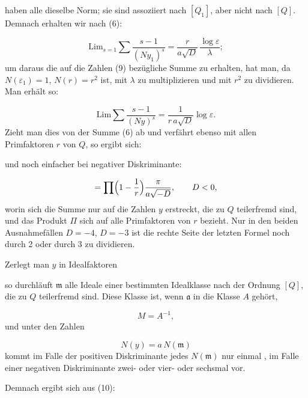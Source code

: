
haben alle dieselbe Norm; sie sind assoziiert nach $[Q_1]$, aber
nicht nach $[Q]$. Demnach erhalten wir nach (6):

\[ \mathrm{Lim}_{s=1}\sum\frac{s-1}{(Ny_1)^s} = \frac{r}{a\sqrt D}\,\frac{\log\varepsilon}{\lambda}; \]
um daraus die auf die Zahlen (9) bezügliche Summe zu erhalten,
hat man, da $N(\varepsilon_1)=1$, $N(r)=r^2$ ist, mit $\lambda$ zu multiplizieren
und mit $r^2$ zu dividieren. Man erhält so:

\[ \mathrm{Lim}\sum\frac{s-1}{(Ny)^s} = \frac{1}{r\,a\sqrt D}\log\varepsilon. \]
Zieht man dies von der Summe (6) ab und verfährt ebenso
mit allen Primfaktoren $r$ von $Q$, so ergibt sich:

und noch einfacher bei negativer Diskriminante:

\[ = \prod\Bigl(1-\frac1r\Bigr)\frac{\pi}{a\sqrt{-D}}, \qquad D<0, \]
worin sich die Summe nur auf die Zahlen $y$ erstreckt, die
zu $Q$ teilerfremd sind, und das Produkt $\Pi$ sich auf alle
Primfaktoren von $r$ bezieht. %
Nur in den beiden Ausnahmefällen
$D=-4$, $D=-3$ ist die rechte Seite der letzten Formel
noch durch 2 oder durch 3 zu dividieren.

Zerlegt man $y$ in Idealfaktoren

so durchläuft $\mathfrak{m}$ alle Ideale einer bestimmten Idealklasse nach
der Ordnung $[Q]$, die zu $Q$ teilerfremd sind. Diese Klasse ist,
wenn $\mathfrak{a}$ in die Klasse $A$ gehört,

\[ M = A^{-1}, \]
und unter den Zahlen

\[ N(y) = a\,N(\mathfrak{m}) \]
kommt im Falle der positiven Diskriminante jedes $N(\mathfrak{m})$ nur einmal
, im Falle einer negativen Diskriminante zwei- oder vier- oder
sechsmal vor.

Demnach ergibt sich aus (10):

